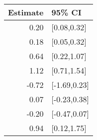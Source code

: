 \begin{tabular}{rl}
  \hline
Estimate & 95\% CI \\ 
  \hline
0.20 & [0.08,0.32] \\ 
  0.18 & [0.05,0.32] \\ 
  0.64 & [0.22,1.07] \\ 
  1.12 & [0.71,1.54] \\ 
  -0.72 & [-1.69,0.23] \\ 
  0.07 & [-0.23,0.38] \\ 
  -0.20 & [-0.47,0.07] \\ 
  0.94 & [0.12,1.75] \\ 
   \hline
\end{tabular}

